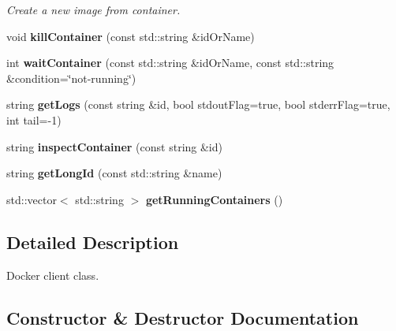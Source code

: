 \begin{DoxyCompactItemize}
\begin{DoxyCompactList}\small\item\em Create a new image from container. \end{DoxyCompactList}\item 
\mbox{\label{classDockerClientpp_1_1DockerClient_a2d762497fb4d630461fd002818edccf3}} 
void {\bfseries kill\+Container} (const std\+::string \&id\+Or\+Name)
\item 
\mbox{\label{classDockerClientpp_1_1DockerClient_ad8642a368a4141a742e98fcf54a4ed8b}} 
int {\bfseries wait\+Container} (const std\+::string \&id\+Or\+Name, const std\+::string \&condition=\char`\"{}not-\/running\char`\"{})
\item 
\mbox{\label{classDockerClientpp_1_1DockerClient_ad7b42dedc558822bd998d6941fa1467c}} 
string {\bfseries get\+Logs} (const string \&id, bool stdout\+Flag=true, bool stderr\+Flag=true, int tail=-\/1)
\item 
\mbox{\label{classDockerClientpp_1_1DockerClient_a8235d511938d3be7d27d559a77724f85}} 
string {\bfseries inspect\+Container} (const string \&id)
\item 
\mbox{\label{classDockerClientpp_1_1DockerClient_adbd650b136251326b9d6d8282505f34b}} 
string {\bfseries get\+Long\+Id} (const std\+::string \&name)
\item 
\mbox{\label{classDockerClientpp_1_1DockerClient_a9869484d6f0f33ff645f587e626ecb00}} 
std\+::vector$<$ std\+::string $>$ {\bfseries get\+Running\+Containers} ()
\end{DoxyCompactItemize}


\subsection{Detailed Description}
Docker client class. 

\subsection{Constructor \& Destructor Documentation}
\mbox{\label{classDockerClientpp_1_1DockerClient_ad31ac3b1fb47c88e257166ad3a51bd95}} 
